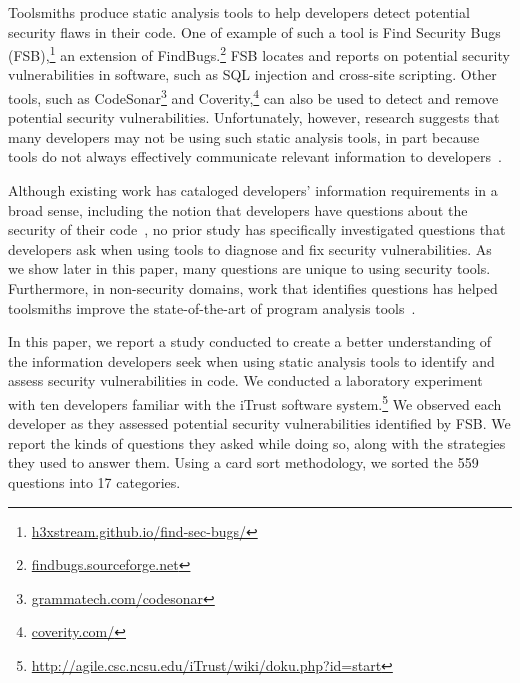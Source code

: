 \documentclass{acm_proc_article-sp}
\newcommand{\blind}[1]{#1}
\begin{document}
Toolsmiths produce static analysis tools to help developers detect potential security flaws in their code. 
One of example of such a tool is Find Security Bugs (FSB),\footnote{\url{h3xstream.github.io/find-sec-bugs/}} an extension of FindBugs.\footnote{\url{findbugs.sourceforge.net}} 
FSB locates and reports on potential security vulnerabilities in software, such as SQL injection and cross-site scripting.  
Other tools, such as CodeSonar\footnote{\url{grammatech.com/codesonar}} and Coverity,\footnote{\url{coverity.com/}} can also be used to detect and remove potential security vulnerabilities.
Unfortunately, however, research suggests that many developers may not be using such static analysis tools, in part because tools do not always effectively communicate relevant information to developers~\cite{johnson2013don}. 


Although existing work has cataloged developers' information requirements in a broad sense, including the notion that developers have questions about the security of their code~\cite{latoza2010hard}, no prior study has specifically investigated questions that developers ask when using tools to diagnose and fix security vulnerabilities. 
As we show later in this paper, many questions are unique to using security tools.
Furthermore, in non-security domains, work that identifies questions has helped toolsmiths improve the state-of-the-art of program analysis tools~\cite{kononenko2012automatically, servant2012history, yoon2013visualization}. 





In this paper, we report a study conducted to create a better understanding of the information developers seek when using static analysis tools to identify and assess security vulnerabilities in code.
We conducted a laboratory experiment with ten developers familiar with the iTrust software system.\footnote{\blind{\url{http://agile.csc.ncsu.edu/iTrust/wiki/doku.php?id=start}}} 
We observed each developer as they assessed potential security vulnerabilities identified by FSB. 
We report the kinds of questions they asked while doing so, along with the strategies they used to answer them.
Using a card sort methodology, we sorted the 559 questions into 17 categories. 
\end{document}
